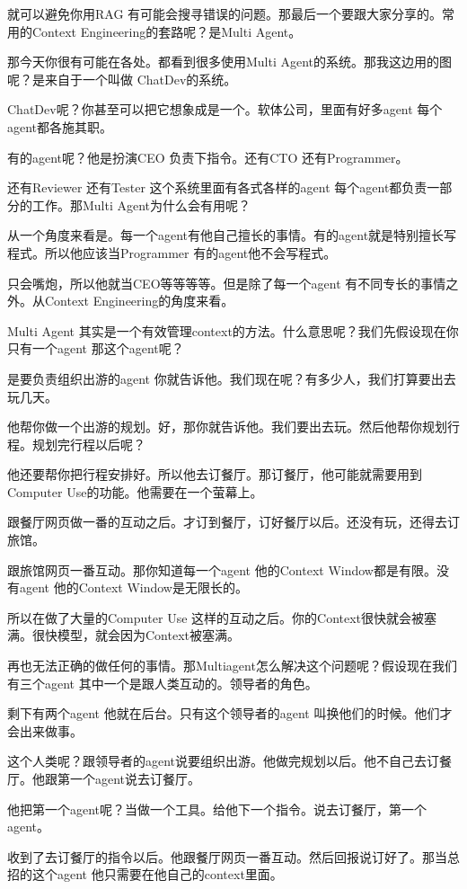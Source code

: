 \documentclass[12pt,a4paper]{article}
\begin{document}
就可以避免你用RAG 有可能会搜寻错误的问题。那最后一个要跟大家分享的。常用的Context Engineering的套路呢？是Multi Agent。

那今天你很有可能在各处。都看到很多使用Multi Agent的系统。那我这边用的图呢？是来自于一个叫做 ChatDev的系统。

ChatDev呢？你甚至可以把它想象成是一个。软体公司，里面有好多agent 每个agent都各施其职。

有的agent呢？他是扮演CEO 负责下指令。还有CTO 还有Programmer。

还有Reviewer 还有Tester 这个系统里面有各式各样的agent 每个agent都负责一部分的工作。那Multi Agent为什么会有用呢？

从一个角度来看是。每一个agent有他自己擅长的事情。有的agent就是特别擅长写程式。所以他应该当Programmer 有的agent他不会写程式。

只会嘴炮，所以他就当CEO等等等等。但是除了每一个agent 有不同专长的事情之外。从Context Engineering的角度来看。

Multi Agent 其实是一个有效管理context的方法。什么意思呢？我们先假设现在你只有一个agent 那这个agent呢？

是要负责组织出游的agent 你就告诉他。我们现在呢？有多少人，我们打算要出去玩几天。

他帮你做一个出游的规划。好，那你就告诉他。我们要出去玩。然后他帮你规划行程。规划完行程以后呢？

他还要帮你把行程安排好。所以他去订餐厅。那订餐厅，他可能就需要用到Computer Use的功能。他需要在一个萤幕上。

跟餐厅网页做一番的互动之后。才订到餐厅，订好餐厅以后。还没有玩，还得去订旅馆。

跟旅馆网页一番互动。那你知道每一个agent 他的Context Window都是有限。没有agent 他的Context Window是无限长的。

所以在做了大量的Computer Use 这样的互动之后。你的Context很快就会被塞满。很快模型，就会因为Context被塞满。

再也无法正确的做任何的事情。那Multiagent怎么解决这个问题呢？假设现在我们有三个agent 其中一个是跟人类互动的。领导者的角色。

剩下有两个agent 他就在后台。只有这个领导者的agent 叫换他们的时候。他们才会出来做事。

这个人类呢？跟领导者的agent说要组织出游。他做完规划以后。他不自己去订餐厅。他跟第一个agent说去订餐厅。

他把第一个agent呢？当做一个工具。给他下一个指令。说去订餐厅，第一个agent。

收到了去订餐厅的指令以后。他跟餐厅网页一番互动。然后回报说订好了。那当总招的这个agent 他只需要在他自己的context里面。
\end{document}

